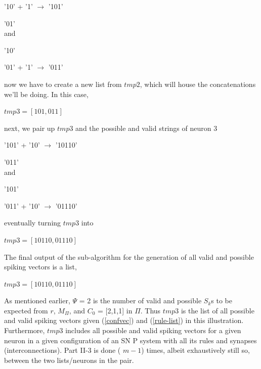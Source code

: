 \documentclass{svmultm}
\begin{document}
'10'  +	'1' $\rightarrow$ '101'

'01' 
\\
and 

'10'

'01'  +	'1' $\rightarrow$ '011'

now we have to create a new list from $tmp2$, which will house the concatenations we'll be doing. In this case, 

		$tmp3 = [ 101, 011 ] $

next, we pair up $tmp3$ and the possible and valid strings of neuron 3 

'101' + '10' $\rightarrow$ '10110'

'011'
\\ 
and 

'101'

'011' + '10' $\rightarrow$ '01110' 

eventually turning $tmp3$ into 

		$tmp3 = [ 10110, 01110 ]$ 

The final output of the sub-algorithm for the generation of all valid and possible spiking vectors is a list, 

		$tmp3 = [ 10110, 01110 ] $

As mentioned earlier, $\Psi$ = 2 is the number of valid and possible $S_k$s to be expected from $r$, $M_\Pi$, and $C_0$ = [2,1,1] in $\Pi$. Thus $tmp3$ is the list of all possible and valid spiking vectors given (\ref{confvec}) and (\ref{rule-list}) in this illustration. Furthermore, $tmp3$ includes all possible and valid spiking vectors for a given neuron in a given configuration of an SN P system with all its rules and 
synapses (interconnections). Part II-3 is done ( $m - 1$) times, albeit exhaustively still so, between the two lists/neurons in the pair. 

\end{document}
